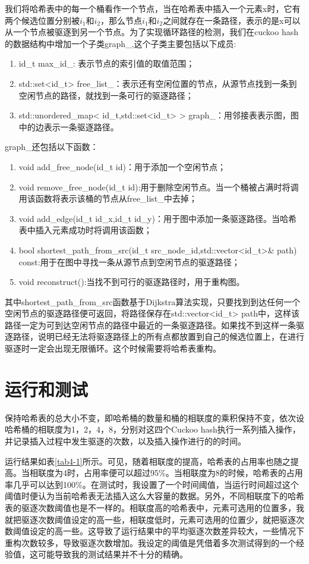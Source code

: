 \documentclass[supercite]{Experimental_Report}
\theoremstyle{definition}
\begin{document}
我们将哈希表中的每一个桶看作一个节点，当在哈希表中插入一个元素x时，它有两个候选位置分别被$i_1$和$i_2$，那么节点$i_1$和$i_2$之间就存在一条路径，表示的是x可以从一个节点被驱逐到另一个节点。为了实现循环路径的检测，我们在cuckoo hash的数据结构中增加一个子类graph\_,这个子类主要包括以下成员:
\begin{enumerate}
\item id\_t max\_id\_: 表示节点的索引值的取值范围；
\item std::set<id\_t> free\_list\_：表示还有空闲位置的节点，从源节点找到一条到空闲节点的路径，就找到一条可行的驱逐路径；
\item std::unordered\_map< id\_t,std::set<id\_t> > graph\_：用邻接表表示图，图中的边表示一条驱逐路径。
\end{enumerate}

graph\_还包括以下函数：
\begin{enumerate}
\item void add\_free\_node(id\_t id)：用于添加一个空闲节点；
\item void remove\_free\_node(id\_t id):用于删除空闲节点。当一个桶被占满时将调用该函数将表示该桶的节点从free\_list\_中去掉；
\item void add\_edge(id\_t id\_x,id\_t id\_y)：用于图中添加一条驱逐路径。当哈希表中插入元素成功时将调用该函数；
\item bool shortest\_path\_from\_src(id\_t src\_node\_id,std::vector<id\_t>\& path) const:用于在图中寻找一条从源节点到空闲节点的驱逐路径；
\item void reconstruct():当找不到可行的驱逐路径时，用于重构图。

\end{enumerate}

其中shortest\_path\_from\_src函数基于Dijkstra算法实现，只要找到到达任何一个空闲节点的驱逐路径便可返回，将路径保存在std::vector<id\_t> path中，这样该路径一定为可到达空闲节点的路径中最近的一条驱逐路径。如果找不到这样一条驱逐路径，说明已经无法将驱逐路径上的所有点都放置到自己的候选位置上，在进行驱逐时一定会出现无限循环。这个时候需要将哈希表重构。
\newpage
\section{运行和测试}

保持哈希表的总大小不变，即哈希桶的数量和桶的相联度的乘积保持不变，依次设哈希桶的相联度为1，2，4，8，分别对这四个Cuckoo hash执行一系列插入操作，并记录插入过程中发生驱逐的次数，以及插入操作进行的的时间。

运行结果如表\ref{tab4-1}所示。可见，随着相联度的提高，哈希表的占用率也随之提高。当相联度为4时，占用率便可以超过95\%。当相联度为8的时候，哈希表的占用率几乎可以达到100\%。在测试时，我设置了一个时间阈值，当运行时间超过这个阈值时便认为当前哈希表无法插入这么大容量的数据。另外，不同相联度下的哈希表的驱逐次数阈值也是不一样的。相联度高的哈希表中，元素可选用的位置多，我就把驱逐次数阈值设定的高一些，相联度低时，元素可选用的位置少，就把驱逐次数阈值设定的高一些。这导致了运行结果中的平均驱逐次数差异较大，一些情况下重构次数较多，导致驱逐次数增加。我设定的阈值是凭借着多次测试得到的一个经验值，这可能导致我的测试结果并不十分的精确。
\end{document}
